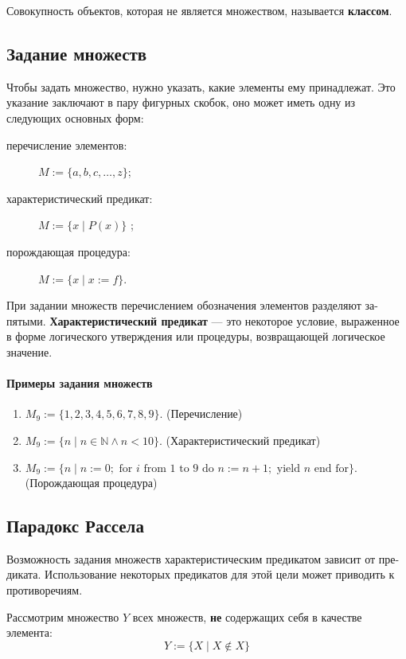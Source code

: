 Совокупность объектов, которая не является множеством, называется \textbf{классом}.

\subsection*{Задание множеств}
Чтобы задать множество, нужно указать, какие элементы ему принадлежат. Это
указание заключают в пару фигурных скобок, оно может иметь одну из следующих основных форм:

\begin{description}
    \item[перечисление элементов:] $M := \{a, b, c, \ldots, z\}$;
    \item[характеристический предикат:] $M := \{x \mid P(x)\}$ ;
    \item[порождающая процедура:] $M := \{x \mid x := f\}$.
\end{description}

При задании множеств перечислением обозначения элементов разделяют за-
пятыми. \textbf{Характеристический предикат} --- это некоторое условие, выраженное
в форме логического утверждения или процедуры, возвращающей логическое
значение.

\paragraph{Примеры задания множеств}
\begin{enumerate}
    \item $M_9 := \{1, 2, 3, 4, 5, 6, 7, 8, 9\}$. \hfill (Перечисление)
    \item $M_9 := \{n \mid n \in \mathbb{N} \land n < 10\}$. \hfill (Характеристический предикат)
    \item $M_9 := \{n \mid n := 0; \text{ for } i \text{ from } 1 \text{ to } 9 \text{ do } n := n + 1; \text{ yield } n \text{ end for}\}$. \hfill (Порождающая процедура)
\end{enumerate}

\subsection*{Парадокс Рассела}
Возможность задания множеств характеристическим предикатом зависит от пре-
диката. Использование некоторых предикатов для этой цели может приводить
к противоречиям.

Рассмотрим множество $Y$ всех множеств, \textbf{не} содержащих себя в качестве элемента:
$$Y := \{X \mid X \notin X\}$$

